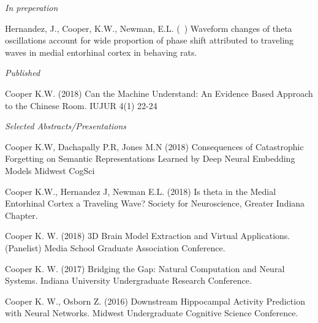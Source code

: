 \begin{cvpubentries}


\iftrue
  \cvpubentry
    {\textit{In preperation}} %
    { } %
    { } %
    { } %
    {
      \begin{cvpubitems} %
        \item {Hernandez,  J.,  Cooper,  K.W.,  Newman,  E.L.  (~)  Waveform  changes  of  theta  oscillations  account  for  wide  proportion  of  phase  shift  attributed  to  traveling  waves  in  medial  entorhinal  cortex  in  behaving  rats. }
      \end{cvpubitems}
    }
\fi

\iffalse
  \cvpubentry
    {\textit{In press}} %
    {} %
    {} %
    {} %
    {
      \begin{cvpubitems} %
        \item {pub}
      \end{cvpubitems}
    }
\fi

  \cvpubentry
    {\textit{Published}} %
    {} %
    {} %
    {} %
    {
      \begin{cvpubitems} %
        \item {Cooper K.W. (2018) Can the Machine Understand: An Evidence Based Approach to the Chinese Room. IUJUR 4(1) 22-24}
      \end{cvpubitems}
    }
\iffalse %
\fi

\cvpubentry
    {\textit{Selected Abstracts/Presentations}} %
    {} %
    {} %
    {} %
    {
      \begin{cvpubitems} %
        \item {Cooper K.W, Dachapally P.R, Jones M.N (2018) Consequences of Catastrophic Forgetting on Semantic Representations Learned by Deep Neural Embedding Models Midwest CogSci}
	\item{Cooper K.W., Hernandez J, Newman E.L. (2018) Is theta in the Medial Entorhinal Cortex a Traveling Wave? Society for Neuroscience, Greater Indiana Chapter.}
	\item{Cooper K. W. (2018) 3D Brain Model Extraction and Virtual Applications. (Panelist) Media School Graduate Association Conference.}
	\item{Cooper K. W. (2017) Bridging the Gap: Natural Computation and Neural Systems. Indiana University Undergraduate Research Conference.}
	\item{Cooper K. W., Osborn Z. (2016) Downstream Hippocampal Activity Prediction with Neural Networks. Midwest Undergraduate Cognitive Science Conference.}
      \end{cvpubitems}
    }

\end{cvpubentries}
